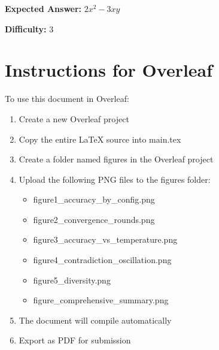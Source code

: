 \documentclass[conference]{IEEEtran}
\begin{document}
\textbf{Expected Answer:} $2x^2 - 3xy$

\textbf{Difficulty:} 3

\section{Instructions for Overleaf}

To use this document in Overleaf:

\begin{enumerate}
\item Create a new Overleaf project
\item Copy the entire LaTeX source into main.tex
\item Create a folder named figures in the Overleaf project
\item Upload the following PNG files to the figures folder:
    \begin{itemize}
    \item figure1\_accuracy\_by\_config.png
    \item figure2\_convergence\_rounds.png
    \item figure3\_accuracy\_vs\_temperature.png
    \item figure4\_contradiction\_oscillation.png
    \item figure5\_diversity.png
    \item figure\_comprehensive\_summary.png
    \end{itemize}
\item The document will compile automatically
\item Export as PDF for submission
\end{enumerate}
\end{document}
